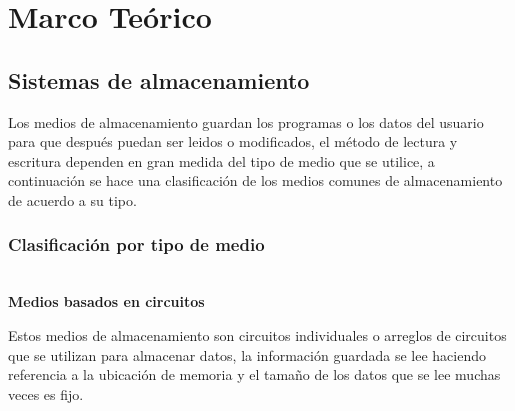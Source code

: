   \chapter{Marco Te\'{o}rico}
  \label{chap:cap1}
    \section {Sistemas de almacenamiento}

Los medios de almacenamiento guardan los programas o los datos del usuario para que despu\'{e}s puedan ser leidos o modificados, el m\'{e}todo de lectura y escritura dependen en gran medida del tipo de medio que se utilice, a continuaci\'{o}n se hace una clasificaci\'{o}n de los medios comunes de almacenamiento de acuerdo a su tipo.

\subsection {Clasificaci\'{o}n por tipo de medio}

\textbf{\\ Medios basados en circuitos \\}

Estos medios de almacenamiento son circuitos individuales o arreglos de circuitos que se utilizan para almacenar datos, la informaci\'{o}n guardada se lee haciendo referencia a la ubicaci\'{o}n de memoria y el tama\~{n}o de los datos que se lee muchas veces es fijo.

